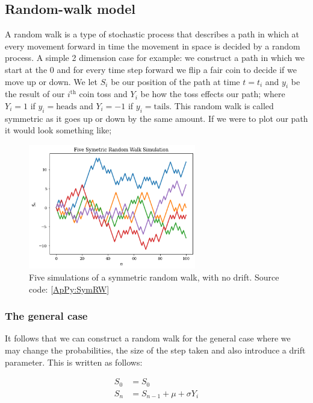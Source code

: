 \subsection{Random-walk model}

A random walk is a type of stochastic process that describes a path in which at every movement forward in time the movement in space is decided by a random process. A simple 2 dimension case for example: we construct a path in which we start at the 0 and for every time step forward we flip a fair coin to decide if we move up or down. We let \( S_i \) be our position of the path at time \(t = t_i\) and \(y_i\) be the result of our \(i^\text{th}\) coin toss and \(Y_i\) be how the toss effects our path; where \(Y_i = 1\) if \( y_i = \text{heads} \) and \(Y_i = -1\) if \(y_i = \text{tails}\). This random walk is called symmetric as it goes up or down by the same amount. If we were to plot our path it would look something like;

\begin{figure}[H]
    \centering
    \includegraphics[width=0.65\textwidth]{Chapters/C1/plots/RW_Simulations.png}
    \caption{Five simulations of a symmetric random walk, with no drift. Source code: \autoref{ApPy:SymRW}}\label{C1fig:OptionVolume}
\end{figure}

\subsubsection{The general case}

It follows that we can construct a random walk for the general case where we may change the probabilities, the size of the step taken and also introduce a drift parameter. This is written as follows:

\begin{align*}
    S_0 &= S_0 \\
    S_n &= S_{n-1} + \mu + \sigma Y_i
\end{align*}

